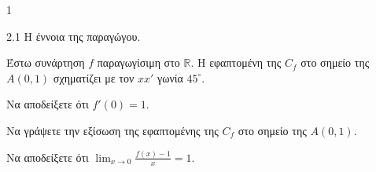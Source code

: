 \begin{ylh}{1}
    \item 2.1 Η έννοια της παραγώγου.
\end{ylh}
Έστω συνάρτηση $f$ παραγωγίσιμη στο $\mathbb{R}$. Η εφαπτομένη της $C_f$ στο σημείο της $A(0,1)$ σχηματίζει με τον $xx'$ γωνία $45^\circ$.
\begin{alist}
\item Να αποδείξετε ότι $f'(0)=1$. 
\item Να γράψετε την εξίσωση της εφαπτομένης της $C_f$ στο σημείο της $A(0,1)$. 
\item Να αποδείξετε ότι $\lim_{x\to0} \frac{f(x)-1}{x}=1$. 
\end{alist}